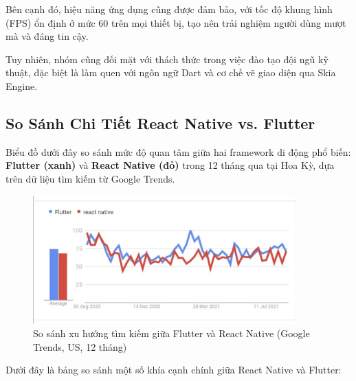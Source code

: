 Bên cạnh đó, hiệu năng ứng dụng cũng được đảm bảo, với tốc độ khung hình (FPS) ổn định ở mức 60 trên mọi thiết bị,  
tạo nên trải nghiệm người dùng mượt mà và đáng tin cậy.

Tuy nhiên, nhóm cũng đối mặt với thách thức trong việc đào tạo đội ngũ kỹ thuật,  
đặc biệt là làm quen với ngôn ngữ Dart và cơ chế vẽ giao diện qua Skia Engine.

\subsection{So Sánh Chi Tiết React Native vs. Flutter}
\renewcommand{\labelitemi}{--}    
\begin{flushleft}
    \hspace*{0.8cm}Biểu đồ dưới đây so sánh mức độ quan tâm giữa hai framework di động phổ biến: \textbf{Flutter (xanh)} và \textbf{React Native (đỏ)} trong 12 tháng qua tại Hoa Kỳ, dựa trên dữ liệu tìm kiếm từ Google Trends.

    \begin{figure}[H]
        \centering
        \includegraphics[width=0.9\textwidth]{images/reactNative_flutter.png}
        \caption{So sánh xu hướng tìm kiếm giữa Flutter và React Native (Google Trends, US, 12 tháng)}
    \end{figure}

    \vspace{0.5cm}
    Dưới đây là bảng so sánh một số khía cạnh chính giữa React Native và Flutter:


\end{flushleft}
